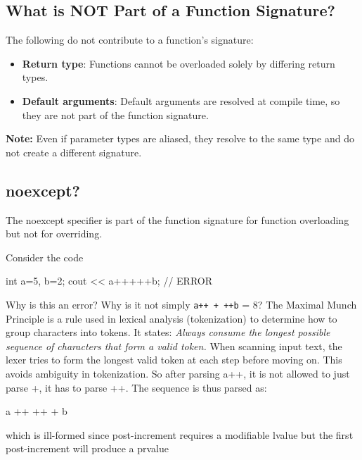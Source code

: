 \documentclass{report}
\begin{document}
    \bigbreak \noindent 
    \subsection{What is NOT Part of a Function Signature? }
    \bigbreak \noindent 
    The following do not contribute to a function’s signature:
    \begin{itemize}
        \item \textbf{Return type}: Functions cannot be overloaded solely by differing return types.
        \item \textbf{Default arguments}: Default arguments are resolved at compile time, so they are not part of the function signature.
    \end{itemize}
    \bigbreak \noindent 
    \textbf{Note:} Even if parameter types are aliased, they resolve to the same type and do not create a different signature.

    \bigbreak \noindent 
    \subsection{noexcept?}
    \bigbreak \noindent 
    The noexcept specifier is part of the function signature for function overloading but not for overriding.

    \pagebreak 
    \bigbreak \noindent 
    Consider the code
    \bigbreak \noindent 
    \begin{cppcode}
    int a=5, b=2; 
    cout << a+++++b; // ERROR
    \end{cppcode}
    \bigbreak \noindent 
    Why is this an error? Why is it not simply \texttt{a++ + ++b} = 8? The Maximal Munch Principle is a rule used in lexical analysis (tokenization) to determine how to group characters into tokens. It states: \textit{Always consume the longest possible sequence of characters that form a valid token.}
    \bigbreak \noindent 
    When scanning input text, the lexer tries to form the longest valid token at each step before moving on. This avoids ambiguity in tokenization. So after parsing a++, it is not allowed to just parse +, it has to parse ++. The sequence is thus parsed as:
    \bigbreak \noindent 
    \begin{cppcode}
    a ++ ++ + b
    \end{cppcode}
    which is ill-formed since post-increment requires a modifiable lvalue but the first post-increment will produce a prvalue
\end{document}
